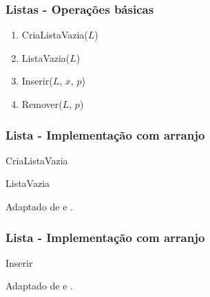 \documentclass[aspectratio=169]{beamer}
\begin{document}

\begin{frame}
\frametitle{Listas - Operações básicas}
\begin{enumerate}
 \item CriaListaVazia($L$) 
 \item ListaVazia($L$)
 \item Inserir($L$, $x$, $p$)
 \item Remover($L$, $p$) 
\end{enumerate}
\end{frame}


\begin{frame}
\frametitle{Lista - Implementação com arranjo}
\begin{algorithm}[H]
\caption{CriaListaVazia} 
\label{CriaListaVazia}
\end{algorithm}
\begin{algorithm}[H]
\caption{ListaVazia} 
\label{ListaVazia}
\end{algorithm}
\tiny{ Adaptado de  e .}
\end{frame}


\begin{frame}
\frametitle{Lista - Implementação com arranjo}
\begin{algorithm}[H]
\caption{Inserir} 
\label{Inserir}
\end{algorithm}
\tiny{ Adaptado de  e .}
\end{frame}
\end{document}
